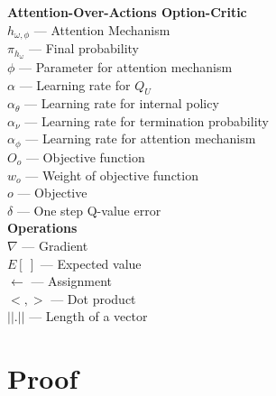 \documentclass{article}
\begin{document}
	{\bfseries Attention-Over-Actions Option-Critic}\\
	$h_{\omega,\phi}$ --- Attention Mechanism\\
	$\pi_{h_\omega}$ --- Final probability\\
	$\phi$ --- Parameter for attention mechanism\\
	$\alpha$ --- Learning rate for $Q_U$\\
	$\alpha_\theta$ --- Learning rate for internal policy\\
	$\alpha_\nu$ --- Learning rate for termination probability\\
	$\alpha_\phi$ --- Learning rate for attention mechanism\\
	$O_o$ --- Objective function\\
	$w_o$ --- Weight of objective function\\
	$o$ --- Objective\\
	$\delta$ --- One step Q-value error\vspace{0.1in}\\
	{\bfseries Operations}\\
	$\nabla$ --- Gradient\\
	$E[\ ]$ --- Expected value\\
	$\leftarrow$ --- Assignment\\
	$<,>$ --- Dot product\\
	$||.||$ --- Length of a vector\\
	\section{Proof}
\end{document}
